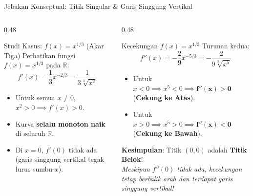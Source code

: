 \documentclass[aspectratio=169,10pt]{beamer}
\begin{document}
\begin{frame}{Jebakan Konseptual: Titik Singular \& Garis Singgung Vertikal}
    \begin{columns}[T]
        \begin{column}{0.48\textwidth}
            \begin{alertblock}{Studi Kasus: $f(x) = x^{1/3}$ (Akar Tiga)}
                Perhatikan fungsi $f(x) = x^{1/3}$ pada $\mathbb{R}$:
                \[
                    f'(x) = \frac{1}{3}x^{-2/3} = \frac{1}{3\sqrt[3]{x^2}}
                \]
                \begin{itemize}
                    \item Untuk semua $x \neq 0$, $x^2 > 0 \implies f'(x) > 0$.
                    \item Kurva \textbf{selalu monoton naik} di seluruh $\mathbb{R}$.
                    \item Di $x = 0$, $f'(0)$ tidak ada (garis singgung vertikal tegak lurus sumbu-$x$).
                \end{itemize}
            \end{alertblock}
        \end{column}

        \begin{column}{0.48\textwidth}
            \begin{exampleblock}{Kecekungan $f(x) = x^{1/3}$}
                Turunan kedua:
                \[
                    f''(x) = -\frac{2}{9}x^{-5/3} = -\frac{2}{9\sqrt[3]{x^5}}
                \]
                \begin{itemize}
                    \item Untuk $x < 0 \implies x^5 < 0 \implies \mathbf{f''(x) > 0}$ (\textbf{Cekung ke Atas}).
                    \item Untuk $x > 0 \implies x^5 > 0 \implies \mathbf{f''(x) < 0}$ (\textbf{Cekung ke Bawah}).
                \end{itemize}
                \textbf{Kesimpulan}: Titik $(0, 0)$ adalah \textbf{Titik Belok}!\\
                {\scriptsize \textit{Meskipun $f''(0)$ tidak ada, kecekungan tetap berbalik arah dan terdapat garis singgung vertikal!}}
            \end{exampleblock}
        \end{column}
    \end{columns}
\end{frame}
\end{document}
